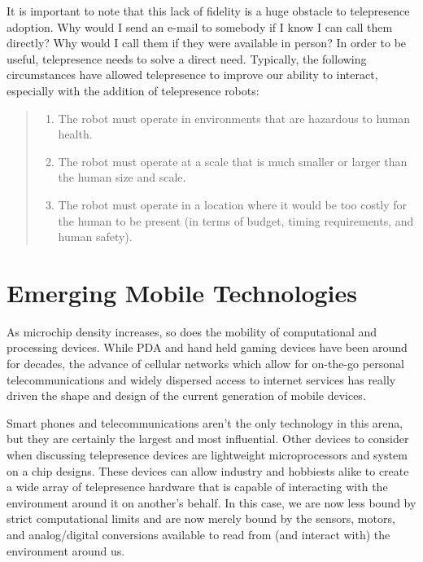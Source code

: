 \documentclass[a4paper,12pt]{report}
\begin{document}
It is important to note that this lack of fidelity is a huge obstacle to telepresence adoption. Why would I send an e-mail to somebody if I know I can call them directly? Why would I call them if they were available in person? In order to be useful, telepresence needs to solve a direct need. Typically, the following circumstances have allowed telepresence to improve our ability to interact, especially with the addition of telepresence robots:

\begin{quote}

\begin{enumerate}
\item The robot must operate in environments that are hazardous to human health.
\item The robot must operate at a scale that is much smaller or larger than the human size and scale.
\item The robot must operate in a location where it would be too costly for the human to be present (in terms of budget, timing requirements, and human safety).
\end{enumerate}
	\begin{flushright}
		\cite{726589}
	\end{flushright}
\end{quote}
\fi

\section{Emerging Mobile Technologies}
As microchip density increases, so does the mobility of computational and processing devices. While PDA and hand held gaming devices have been around for decades, the advance of cellular networks which allow for on-the-go personal telecommunications and widely dispersed access to internet services has really driven the shape and design of the current generation of mobile devices.

Smart phones and telecommunications aren't the only technology in this arena, but they are certainly the largest and most influential. Other devices to consider when discussing telepresence devices are lightweight microprocessors and system on a chip designs. These devices can allow industry and hobbiests alike to create a wide array of telepresence hardware that is capable of interacting with the environment around it on another's behalf. In this case, we are now less bound by strict computational limits and are now merely bound by the sensors, motors, and analog/digital conversions available to read from (and interact with) the environment around us.
\end{document}
